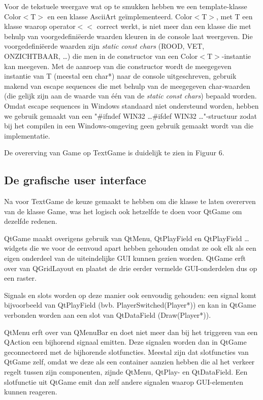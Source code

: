 \documentclass[a4paper,11pt,oneside, titlepage]{article}
\begin{document}
Voor de tekstuele weergave wat op te smukken hebben we een template-klasse Color$<$T$>$ en een klasse AsciiArt ge\"implementeerd. Color$<$T$>$, met T een klasse waarop operator$<<$ correct werkt, is niet meer dan een klasse die met behulp van voorgedefini\"eerde waarden kleuren in de console laat weergeven. Die voorgedefini\"eerde waarden zijn \emph{static const chars} (ROOD, VET, ONZICHTBAAR, \ldots) die men in de constructor van een Color$<$T$>$-instantie kan meegeven. Met de aanroep van die constructor wordt de meegegeven instantie van T (meestal een char*) naar de console uitgeschreven, gebruik makend van escape sequences die met behulp van de meegegeven char-waarden (die gelijk zijn aan de waarde van \'e\'en van de \emph{static const chars}) bepaald worden. Omdat escape sequences in Windows standaard niet ondersteund worden, hebben we gebruik gemaakt van een "\#ifndef WIN32 \ldots \#ifdef WIN32 \ldots "-structuur zodat bij het compilen in een Windows-omgeving geen gebruik gemaakt wordt van die implementatie.

De overerving van Game op TextGame is duidelijk te zien in Figuur 6.
\subsection{De grafische user interface}
Na voor TextGame de keuze gemaakt te hebben om die klasse te laten overerven van de klasse Game, was het logisch ook hetzelfde te doen voor QtGame om dezelfde redenen.

QtGame maakt overigens gebruik van QtMenu, QtPlayField en QtPlayField \ldots widgets die we voor de eenvoud apart hebben gehouden omdat ze ook elk als een eigen onderdeel van de uiteindelijke GUI kunnen gezien worden. QtGame erft over van QGridLayout en plaatst de drie eerder vermelde GUI-onderdelen dus op een raster.

Signals en slots worden op deze manier ook eenvoudig gehouden: een signal komt bijvoorbeeld van QtPlayField (bvb. PlayerSwitched(Player*)) en kan in QtGame verbonden worden aan een slot van QtDataField (Draw(Player*)). 

QtMenu erft over van QMenuBar en doet niet meer dan bij het triggeren van een QAction een bijhorend signaal emitten. Deze signalen worden dan in QtGame geconnecteerd met de bijhorende slotfuncties. Meestal zijn dat slotfuncties van QtGame zelf, omdat we deze als een container aanzien hebben die al het verkeer regelt tussen zijn componenten, zijnde QtMenu, QtPlay- en QtDataField. Een slotfunctie uit QtGame emit dan zelf andere signalen waarop GUI-elementen kunnen reageren.
\end{document}

